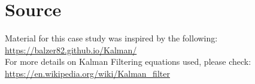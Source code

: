 \documentclass{article}
\begin{document}
\section{Source}
Material for this case study was inspired by the following:\\
\url{https://balzer82.github.io/Kalman/} \\

For more details on Kalman Filtering equations used, please check: \\
\url{https://en.wikipedia.org/wiki/Kalman_filter}
\end{document}
